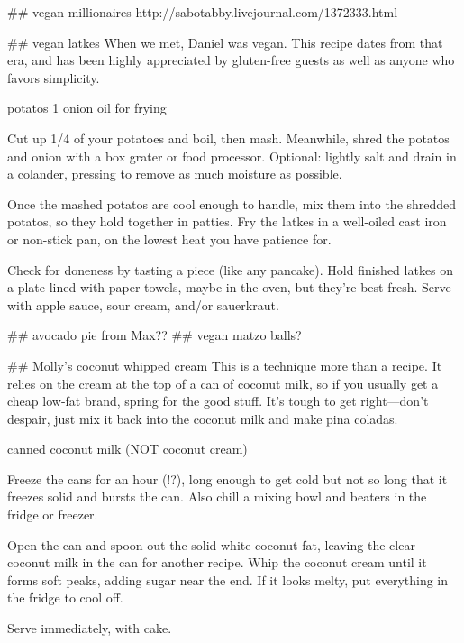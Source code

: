 ## vegan millionaires
http://sabotabby.livejournal.com/1372333.html

## vegan latkes
When we met, Daniel was vegan. This recipe dates from that era, and has been highly appreciated by gluten-free guests as well as anyone who favors simplicity.

potatos
1 onion
oil for frying

Cut up 1/4 of your potatoes and boil, then mash. Meanwhile, shred the potatos and onion with a box grater or food processor. Optional: lightly salt and drain in a colander, pressing to remove as much moisture as possible.

Once the mashed potatos are cool enough to handle, mix them into the shredded potatos, so they hold together in patties. Fry the latkes in a well-oiled cast iron or non-stick pan, on the lowest heat you have patience for.

Check for doneness by tasting a piece (like any pancake). Hold finished latkes on a plate lined with paper towels, maybe in the oven, but they're best fresh. Serve with apple sauce, sour cream, and/or sauerkraut.

## avocado pie from Max??
## vegan matzo balls?

## Molly's coconut whipped cream
This is a technique more than a recipe. It relies on the cream at the top of a can of coconut milk, so if you usually get a cheap low-fat brand, spring for the good stuff. It's tough to get right---don't despair, just mix it back into the coconut milk and make pina coladas.

canned coconut milk (NOT coconut cream)

Freeze the cans for an hour (!?), long enough to get cold but not so long that it freezes solid and bursts the can. Also chill a mixing bowl and beaters in the fridge or freezer.

Open the can and spoon out the solid white coconut fat, leaving the clear coconut milk in the can for another recipe. Whip the coconut cream until it forms soft peaks, adding sugar near the end. If it looks melty, put everything in the fridge to cool off.

Serve immediately, with cake.

